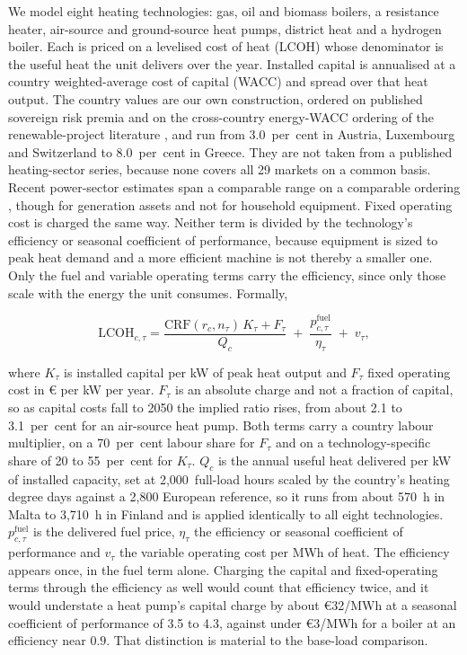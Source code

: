 We model eight heating technologies: gas, oil and biomass boilers, a resistance
heater, air-source and ground-source heat pumps, district heat and a hydrogen
boiler. Each is priced on a levelised cost of heat (LCOH) whose denominator is the
useful heat the unit delivers over the year. Installed capital is annualised at a country weighted-average cost of capital (WACC) and spread over that heat output. The country values are our own construction, ordered on published sovereign risk premia \citep{Damodaran2024crp} and on the cross-country energy-WACC ordering of the renewable-project literature
\citep{Steffen2020wacc}, and run from 3.0~per~cent in Austria, Luxembourg and Switzerland to 8.0~per~cent in Greece.
They are not taken from a published heating-sector series, because none covers all 29
markets on a common basis. Recent power-sector estimates span a comparable range on a
comparable ordering \citep{Hatton2025wacc}, though for generation assets and not for
household equipment. Fixed
operating cost is charged the same way. Neither term is divided by the technology's
efficiency or seasonal coefficient of performance, because equipment is sized to peak
heat demand and a more efficient machine is not thereby a smaller one. Only the fuel
and variable operating terms carry the efficiency, since only those scale with the
energy the unit consumes. Formally,

\begin{equation}
\label{eq:lcoh}
 \mathrm{LCOH}_{c,\tau}
 = \frac{\mathrm{CRF}(r_{c}, n_{\tau})\, K_{\tau} + F_{\tau}}{Q_{c}}
 \;+\; \frac{p^{\mathrm{fuel}}_{c,\tau}}{\eta_{\tau}} \;+\; v_{\tau},
\end{equation}

\noindent where $K_{\tau}$ is installed capital per kW of peak heat output and
$F_{\tau}$ fixed operating cost in \euro{} per kW per year. $F_{\tau}$ is an absolute
charge and not a fraction of capital, so as capital costs fall to 2050 the implied ratio
rises, from about 2.1 to 3.1~per~cent for an air-source heat pump. Both terms carry a
country labour multiplier, on a 70~per~cent labour share for $F_{\tau}$ and on a
technology-specific share of 20 to 55~per~cent for $K_{\tau}$. $Q_{c}$ is the annual
useful heat delivered per kW of installed capacity, set at 2{,}000~full-load hours scaled
by the country's heating degree days against a 2{,}800 European reference, so it runs from
about 570~h in Malta to 3{,}710~h in Finland and is applied identically to all eight
technologies. $p^{\mathrm{fuel}}_{c,\tau}$ is the delivered fuel price,
$\eta_{\tau}$ the efficiency or seasonal coefficient of performance and $v_{\tau}$ the
variable operating cost per MWh of heat. The efficiency appears once, in the fuel term
alone. Charging the capital and fixed-operating terms through the efficiency as well
would count that efficiency twice, and it would understate a heat pump's capital charge
by about \euro{}32/MWh at a seasonal coefficient of performance of 3.5 to 4.3, against
under \euro{}3/MWh for a boiler at an efficiency near $0.9$. That distinction is
material to the base-load comparison.

